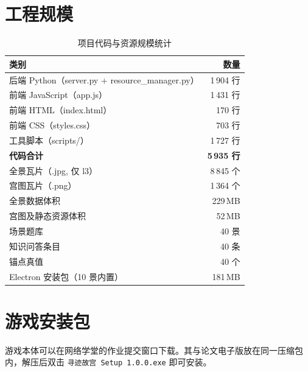\documentclass[UTF8,a4paper,12pt]{ctexart}
\begin{document}
\section{工程规模}
\begin{table}[H]
  \centering
  \caption{项目代码与资源规模统计}
  \begin{tabular}{@{}lr@{}}
    \toprule
    类别 & 数量 \\
    \midrule
    后端 Python（server.py + resource\_manager.py） & 1\,904 行 \\
    前端 JavaScript（app.js） & 1\,431 行 \\
    前端 HTML（index.html） & 170 行 \\
    前端 CSS（styles.css） & 703 行 \\
    工具脚本（scripts/） & 1\,727 行 \\
    \textbf{代码合计} & \textbf{5\,935 行} \\
    \midrule
    全景瓦片（.jpg, 仅 l3） & 8\,845 个 \\
    宫图瓦片（.png） & 1\,364 个 \\
    全景数据体积 & 229\,MB \\
    宫图及静态资源体积 & 52\,MB \\
    \midrule
    场景题库 & 40 景 \\
    知识问答条目 & 40 条 \\
    锚点真值 & 40 个 \\
    \midrule
    Electron 安装包（10 景内置） & 181\,MB \\
    \bottomrule
  \end{tabular}
\end{table}

\section{游戏安装包}
游戏本体可以在网络学堂的作业提交窗口下载。其与论文电子版放在同一压缩包内，解压后双击 \texttt{寻迹故宫 Setup 1.0.0.exe} 即可安装。
\end{document}
